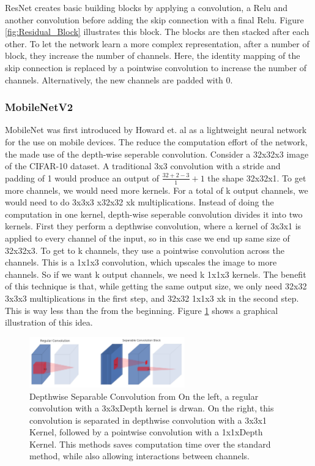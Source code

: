 ResNet creates basic building blocks by applying a convolution, a Relu and
another convolution before adding the skip connection with a final Relu. Figure
\ref{fig:Residual_Block} illustrates this block. The blocks are then stacked
after each other. To let the network learn a more complex representation, after
a number of block, they increase the number of channels. Here, the identity
mapping of the skip connection is replaced by a pointwise convolution to
increase the number of channels. Alternatively, the new channels are padded with
0.



\subsubsection{MobileNetV2}
MobileNet was first introduced by Howard et. al \cite{howard2017mobilenets} as a
lightweight neural network for the use on mobile devices. The reduce the
computation effort of the network, the made use of the depth-wise seperable
convolution. Consider a 32x32x3 image of the CIFAR-10 dataset. A traditional 3x3
convolution with a stride and padding of 1 would produce an output of
$\frac{32+2-3}{1}+1$ the shape 32x32x1. To get more channels, we would need more
kernels. For a total of k output channels, we would need to do 3x3x3 x32x32 xk
multiplications. Instead of doing the computation in one kernel, depth-wise
seperable convolution divides it into two kernels. First they perform a
depthwise convolution, where a kernel of 3x3x1 is applied to every channel of
the input, so in this case we end up same size of 32x32x3. To get to k channels,
they use a pointwise convolution across the channels. This is a 1x1x3
convolution, which upscales the image to more channels. So if we want k output
channels, we need k 1x1x3 kernels. The benefit of this technique is that, while
getting the same output size, we only need 32x32 3x3x3 multiplications in the
first step, and 32x32 1x1x3 xk in the second step. This is way less than the
from the beginning. Figure \ref{fig:DSConv} shows a graphical illustration of
this idea.
\begin{figure}[h!]\label{fig:DSConv}
    \centering
    \includegraphics[width=0.6\textwidth]{images/Depthwise_Separable_Convolution.png}
    \caption{Depthwise Separable Convolution from \cite[Page 3]{sandler2018mobilenetv2} \newline On the left,
     a regular convolution with a 3x3xDepth kernel is drwan. On the right, this
     convolution is separated in depthwise convolution with a 3x3x1 Kernel,
     followed by a pointwise convolution with a 1x1xDepth Kernel. This methods
     saves computation time over the standard method, while also allowing
     interactions between channels.}
\end{figure}



